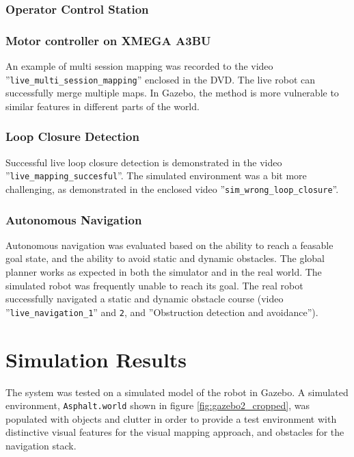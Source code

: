 \subsubsection{Operator Control Station}

\subsubsection{Motor controller on XMEGA A3BU}

An example of multi session mapping was recorded to the video ''\texttt{live\_multi\_session\_mapping}'' enclosed in the DVD. The live robot can successfully merge multiple maps. In Gazebo, the method is more vulnerable to similar features in different parts of the world.

\subsubsection{Loop Closure Detection}

Successful live loop closure detection is demonstrated in the video ''\texttt{live\_mapping\_succesful}''. The simulated environment was a bit more challenging, as demonstrated in the enclosed video ''\texttt{sim\_wrong\_loop\_closure}''.

\subsubsection{Autonomous Navigation}

Autonomous navigation was evaluated based on the ability to reach a feasable goal state, and the ability to avoid static and dynamic obstacles. The global planner works as expected in both the simulator and in the real world. The simulated robot was frequently unable to reach its goal. The real robot successfully navigated a static and dynamic obstacle course (video ''\texttt{live\_navigation\_1}'' and \texttt{2}, and ''Obstruction detection and avoidance'').



\section{Simulation Results}

The system was tested on a simulated model of the robot in Gazebo. A simulated environment, \texttt{Asphalt.world} shown in figure \ref{fig:gazebo2_cropped}, was populated with objects and clutter in order to provide a test environment with distinctive visual features for the visual mapping approach, and obstacles for the navigation stack. 

